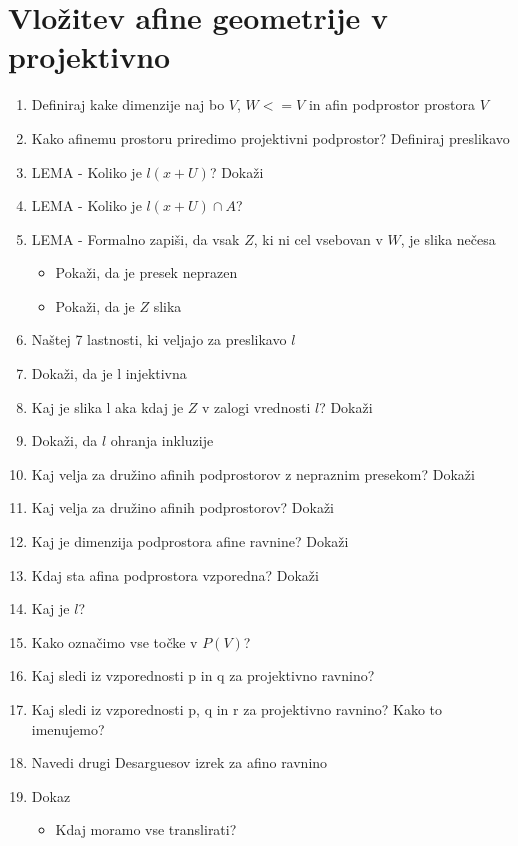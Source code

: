 \documentclass{article}
\begin{document}
    \section{Vložitev afine geometrije v projektivno}
    \begin{enumerate}
        \item Definiraj kake dimenzije naj bo $V$, $W <= V$ in afin podprostor prostora $V$
        \item Kako afinemu prostoru priredimo projektivni podprostor? Definiraj preslikavo
        \item LEMA - Koliko je $l(x + U)$? Dokaži
        \item LEMA - Koliko je $l(x + U) \cap A$?
        \item LEMA - Formalno zapiši, da vsak $Z$, ki ni cel vsebovan v $W$, je slika nečesa
        \begin{itemize}
            \item Pokaži, da je presek neprazen
            \item Pokaži, da je $Z$ slika
        \end{itemize}
        \item Naštej 7 lastnosti, ki veljajo za preslikavo $l$
        \item Dokaži, da je l injektivna
        \item Kaj je slika l aka kdaj je $Z$ v zalogi vrednosti $l$? Dokaži
        \item Dokaži, da $l$ ohranja inkluzije
        \item Kaj velja za družino afinih podprostorov z nepraznim presekom? Dokaži
        \item Kaj velja za družino afinih podprostorov? Dokaži
        \item Kaj je dimenzija podprostora afine ravnine? Dokaži
        \item Kdaj sta afina podprostora vzporedna? Dokaži
        \item Kaj je $l$?
        \item Kako označimo vse točke v $P(V)$?
        \item Kaj sledi iz vzporednosti p in q za projektivno ravnino?
        \item Kaj sledi iz vzporednosti p, q in r za projektivno ravnino? Kako to imenujemo?
        \item Navedi drugi Desarguesov izrek za afino ravnino
        \item Dokaz
        \begin{itemize}
            \item Kdaj moramo vse translirati?

\end{itemize}
\end{enumerate}
\end{document}
